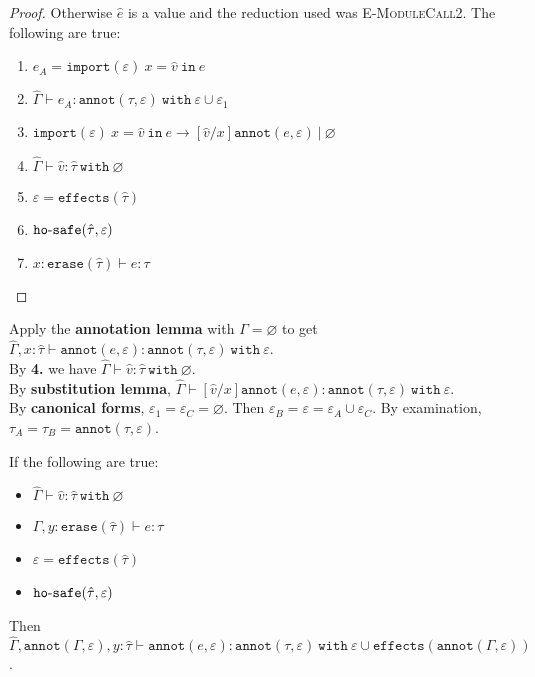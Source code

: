 \documentclass{llncs}
\newcommand{\keywadj}[1]{\mathtt{#1}}
\newcommand{\keyw}[1]{\keywadj{#1}~}
\newcommand{\kw}[1]{\keyw{ #1 }}
\newcommand{\kwa}[1]{\keywadj{ #1 }}
\newcommand{\hyphen}{\hbox{-}}
\begin{document}
\begin{proof}
Otherwise $\hat e$ is a value and the reduction used was \textsc{E-ModuleCall2}. The following are true:
\begin{enumerate}
	\item $e_A = \kwa{import}(\varepsilon)~x = \hat v~\kw{in} e$
	\item $\hat \Gamma \vdash e_A: \kwa{annot}(\tau, \varepsilon)~\kw{with} \varepsilon \cup \varepsilon_1$
	\item $\kwa{import}(\varepsilon)~x = \hat v~\kw{in} e \longrightarrow [\hat v/x]\kwa{annot}(e, \varepsilon)~|~\varnothing$
	\item $\hat \Gamma \vdash \hat v: \hat \tau~\kw{with} \varnothing$
	\item $\varepsilon = \kwa{effects}(\hat \tau)$
	\item $\kwa{ho \hyphen safe}(\hat \tau, \varepsilon)$
	\item $x: \kwa{erase}(\hat \tau) \vdash e: \tau$
\end{enumerate}

\end{proof}

\noindent
Apply the \textbf{annotation lemma} with $\Gamma = \varnothing$ to get $\hat \Gamma, x: \hat \tau \vdash \kwa{annot}(e, \varepsilon): \kwa{annot}(\tau, \varepsilon)~\kw{with} \varepsilon$. \\

\noindent
By \textbf{4.} we have $\hat \Gamma \vdash \hat v: \hat \tau~\kw{with} \varnothing$. \\

\noindent
By \textbf{substitution lemma}, $\hat \Gamma \vdash [\hat v/x]\kwa{annot}(e, \varepsilon): \kwa{annot}(\tau, \varepsilon)~\kw{with} \varepsilon$. \\

\noindent
By \textbf{canonical forms}, $\varepsilon_1 = \varepsilon_C = \varnothing$. Then $\varepsilon_B = \varepsilon = \varepsilon_A \cup \varepsilon_C$. By examination, $\tau_A = \tau_B = \kwa{annot}(\tau, \varepsilon)$.


\hrulefill

\begin{lemma}[Annotation]
If the following are true:

\begin{itemize}
	\item $\hat \Gamma \vdash \hat v : \hat \tau~\kw{with} \varnothing$
	\item $\Gamma, y: \kwa{erase}(\hat \tau) \vdash e: \tau$
	\item $\varepsilon = \kwa{effects}(\hat \tau)$
	\item $\kwa{ho \hyphen safe}(\hat \tau, \varepsilon)$
\end{itemize}

\noindent
Then $\hat \Gamma, \kwa{annot}(\Gamma, \varepsilon), y: \hat \tau \vdash \kwa{annot}(e, \varepsilon) : \kwa{annot}(\tau, \varepsilon)~\kw{with} \varepsilon \cup \kwa{effects}(\kwa{annot}(\Gamma, \varepsilon))$.
\end{lemma}
\end{document}

